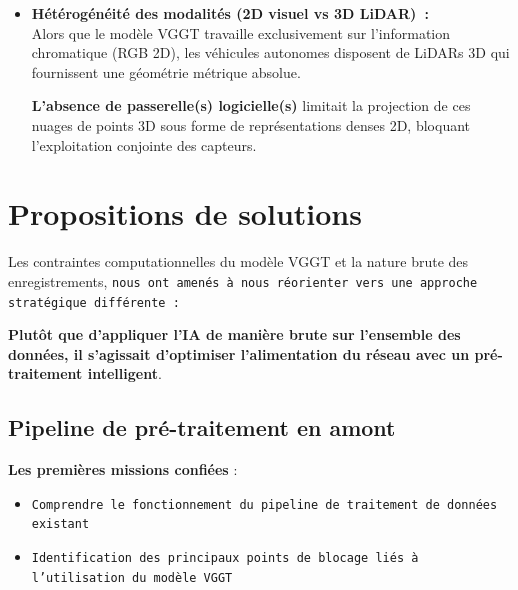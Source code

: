 \documentclass[12pt,a4paper,oneside]{report}
\begin{document}
\begin{itemize}
    \hspace*{1em}Injecter ces images répétitives dans un réseau lourd comme VGGT provoque un gaspillage massif de ressources de calcul sans aucun gain géométrique, et peut induire le modèle en erreur sur des scènes statiques.\vspace{0.2cm}
    
    \item {\bfseries Hétérogénéité des modalités (2D visuel vs 3D LiDAR)~:  \vspace{0.3cm}} \\
    \hspace*{1em}Alors que le modèle VGGT travaille exclusivement sur l'information chromatique (RGB 2D), les véhicules autonomes disposent de LiDARs 3D qui fournissent une géométrie métrique absolue. \vspace{0.05cm}

    \hspace*{1em}\textbf{L'absence de passerelle(s) logicielle(s) }limitait la projection de ces nuages de points 3D sous forme de représentations denses 2D, bloquant l'exploitation conjointe des capteurs.

\end{itemize}

\newpage

\section{Propositions de solutions}
\label{subsec:solutions_pipeline}


\setlength{\parskip}{0.5em}
\setlength{\parindent}{0pt}
\linespread{1.08}\selectfont

\hspace*{1cm} Les contraintes computationnelles du modèle VGGT et la nature brute des enregistrements, \texttt{nous ont amenés à nous réorienter vers une approche stratégique différente~:}

\hspace*{0.5cm}\textbf{Plutôt que d'appliquer l'IA de manière brute sur l'ensemble des données, il s'agissait d'optimiser l'alimentation du réseau avec un pré-traitement intelligent}.
\subsection{Pipeline de pré-traitement en amont}

\hspace*{0.5cm} \textbf{Les premières missions confiées }:
\begin{itemize}[label=\textbullet, leftmargin=2cm]
    \item \texttt{Comprendre le fonctionnement du pipeline de traitement de données existant}
    \item \texttt{Identification des principaux points de blocage liés à l'utilisation du modèle VGGT}
\end{itemize}
\end{document}
